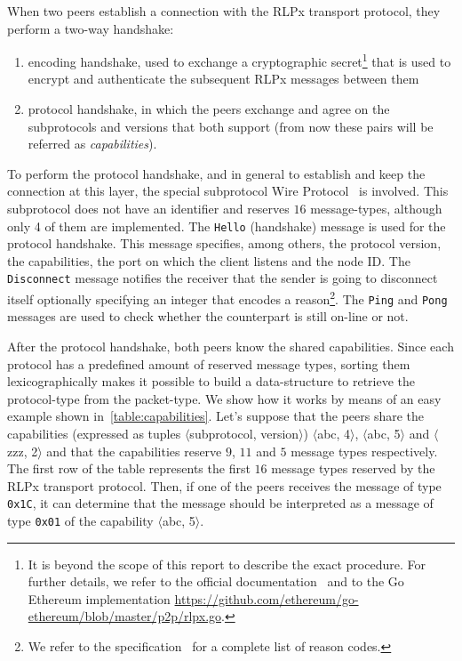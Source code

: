 When two peers establish a connection with the RLPx transport protocol, they
perform a two-way handshake:
\begin{enumerate}
  \item encoding handshake, used to exchange a cryptographic secret\footnote{It
  is beyond the scope of this report to describe the exact procedure. For
  further details, we refer to the official documentation~\cite{rlpx} and to the
  Go Ethereum implementation
  \url{https://github.com/ethereum/go-ethereum/blob/master/p2p/rlpx.go}.}
  that is used to encrypt and authenticate the subsequent RLPx messages between
  them
  \item protocol handshake, in which the peers exchange and agree on the
  subprotocols and versions that both support (from now these pairs will be
  referred as \emph{capabilities}).
\end{enumerate}

To perform the protocol handshake, and in general to establish and keep the
connection at this layer, the special subprotocol \devpp{} Wire
Protocol~\cite{devp2pwire} is involved. This subprotocol does not have an
identifier and reserves $16$ message-types, although only 4 of them are
implemented. The \verb+Hello+ (handshake) message is used for the protocol
handshake. This message specifies, among others, the protocol version, the
capabilities, the port on which the client listens and the node ID. The
\verb+Disconnect+ message notifies the receiver that the sender is going to
disconnect itself optionally specifying an integer that encodes a
reason\footnote{We refer to the \devpp{} specification~\cite{devp2pwire} for a
complete list of reason codes.}. The \verb+Ping+ and \verb+Pong+ messages are
used to check whether the counterpart is still on-line or not.

After the protocol handshake, both peers know the shared capabilities. Since
each protocol has a predefined amount of reserved message types, sorting them
lexicographically makes it possible to build a data-structure to retrieve the
protocol-type from the packet-type. We show how it works by means of an easy
example shown in~\autoref{table:capabilities}. Let's suppose that the peers
share the capabilities (expressed as tuples $\langle$subprotocol,
version$\rangle$) $\langle$abc, 4$\rangle$, $\langle$abc, 5$\rangle$ and
$\langle$zzz, 2$\rangle$ and that the capabilities reserve $9$, $11$ and $5$
message types respectively. The first row of the table represents the first $16$
message types reserved by the RLPx transport protocol. Then, if one of the peers
receives the message of type \texttt{0x1C}, it can determine that the message
should be interpreted as a message of type \texttt{0x01} of the capability
$\langle$abc, 5$\rangle$.

